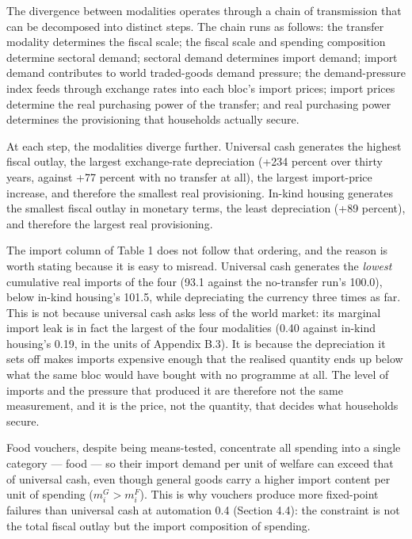 \documentclass[preprint,review,12pt]{elsarticle}
\begin{document}
The divergence between modalities operates through a chain of
transmission that can be decomposed into distinct steps. The chain runs
as follows: the transfer modality determines the fiscal scale; the
fiscal scale and spending composition determine sectoral demand;
sectoral demand determines import demand; import demand contributes to
world traded-goods demand pressure; the demand-pressure index feeds
through exchange rates into each bloc's import prices; import prices
determine the real purchasing power of the transfer; and real purchasing
power determines the provisioning that households actually secure.

At each step, the modalities diverge further. Universal cash generates
the highest fiscal outlay, the largest exchange-rate depreciation (+234
percent over thirty years, against +77 percent with no transfer at all),
the largest import-price increase, and therefore the smallest real
provisioning. In-kind housing generates the smallest fiscal outlay in
monetary terms, the least depreciation (+89 percent), and therefore the
largest real provisioning.

The import column of Table 1 does not follow that ordering, and the
reason is worth stating because it is easy to misread. Universal cash
generates the \emph{lowest} cumulative real imports of the four (93.1
against the no-transfer run's 100.0), below in-kind housing's 101.5,
while depreciating the currency three times as far. This is not because
universal cash asks less of the world market: its marginal import leak is
in fact the largest of the four modalities (0.40 against in-kind housing's
0.19, in the units of Appendix B.3). It is because the depreciation it
sets off makes imports expensive enough that the realised quantity ends
up below what the same bloc would have bought with no programme at all.
The level of imports and the pressure that produced it are therefore not
the same measurement, and it is the price, not the quantity, that decides
what households secure.

Food vouchers, despite being means-tested, concentrate all spending into
a single category --- food --- so their import demand per unit of
welfare can exceed that of universal cash, even though general goods
carry a higher import content per unit of spending (\(m^G_i > m^F_i\)). This is why vouchers produce
more fixed-point failures than universal cash at automation 0.4 (Section
4.4): the constraint is not the total fiscal outlay but the import
composition of spending.
\end{document}
